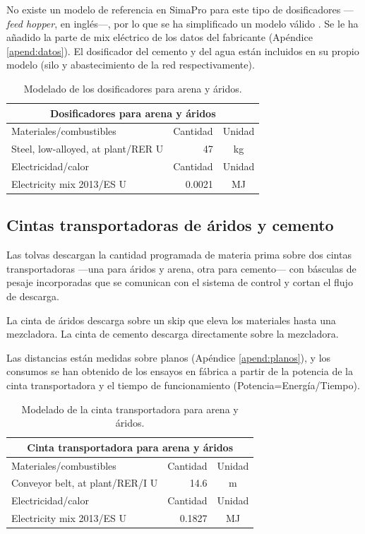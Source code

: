 No existe un modelo de referencia en SimaPro para este tipo de dosificadores —\textit{feed hopper}, en inglés—, por lo que se ha simplificado un modelo válido \cite{woodpellet}. Se le ha añadido la parte de mix eléctrico de los datos del fabricante (Apéndice \ref{apend:datos}). El dosificador del cemento y del agua están incluidos en su propio modelo (silo y abastecimiento de la red respectivamente).

\begin{table}[!htb]
\centering
\begin{tabular}{p{8cm}rc}
\toprule
\multicolumn{3}{c}{Dosificadores para arena y áridos}\\
\midrule
Materiales/combustibles & Cantidad & Unidad\\
\midrule
Steel, low-alloyed, at plant/RER U & 47 & \si{kg}\\
\midrule
Electricidad/calor & Cantidad & Unidad\\
\midrule
Electricity mix 2013/ES U & 0.0021 & \si{MJ}\\
\bottomrule
\end{tabular}
\caption{Modelado de los dosificadores para arena y áridos.}
\label{modeladodedosificadores}
\end{table}

\subsection{Cintas transportadoras de áridos y cemento}

Las tolvas descargan la cantidad programada de materia prima sobre dos cintas transportadoras —una para áridos y arena, otra para cemento— con básculas de pesaje incorporadas que se comunican con el sistema de control y cortan el flujo de descarga.

La cinta de áridos descarga sobre un skip que eleva los materiales hasta una mezcladora. La cinta de cemento descarga directamente sobre la mezcladora.

Las distancias están medidas sobre planos (Apéndice \ref{apend:planos}), y los consumos se han obtenido de los ensayos en fábrica a partir de la potencia de la cinta transportadora y el tiempo de funcionamiento (Potencia=Energía/Tiempo).

\begin{table}[!htb]
\centering
\begin{tabular}{p{8cm}rc}
\toprule
\multicolumn{3}{c}{Cinta transportadora para arena y áridos}\\
\midrule
Materiales/combustibles & Cantidad & Unidad\\
\midrule
Conveyor belt, at plant/RER/I U & 14.6 & \si{m}\\
\midrule
Electricidad/calor & Cantidad & Unidad\\
\midrule
Electricity mix 2013/ES U & 0.1827 & \si{MJ}\\
\bottomrule
\end{tabular}
\caption{Modelado de la cinta transportadora para arena y áridos.}
\label{modeladodecintaarena}
\end{table}

